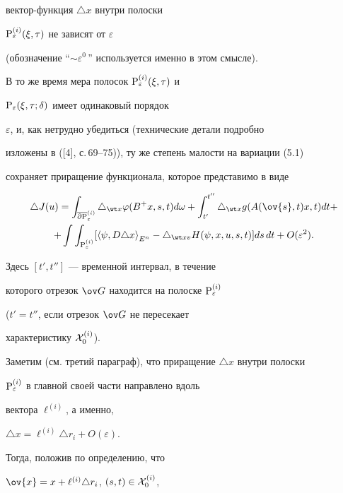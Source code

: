 вектор-функция $\triangle x$ внутри полоски


${\P}_{\varepsilon}^{(i)} (\xi,\tau)$ не зависят от $\varepsilon$


(обозначение ``$\sim \varepsilon^{0}$\,'' используется именно в этом смысле).


В то же время мера полосок ${\P}_{\varepsilon}^{(i)} (\xi,\tau)$ и


${\P}_{\varepsilon}(\xi,\tau; \delta)$ имеет одинаковый порядок


$\varepsilon$, и, как нетрудно убедиться (технические детали подробно


изложены в ([4], с.\,69--75)), ту же степень малости на вариации (5.1)


сохраняет приращение функционала, которое представимо в виде


\begin{multline}


\triangle J(u) = \int_{\overline{\partial{\P}}_{\varepsilon}^{(i)}}


\triangle_{\wt x} \varphi (B^{+}x,s,t) d\omega +


\int_{t'}^{t''}


\triangle_{\wt x} g(A(\ov{s},t)x,t)dt +  \\


+ \int \int_{{\P}_{\varepsilon}^{(i)}} 


[{\la \psi, D \triangle x\ra}_{E^n} - \triangle_{\wt x v}


H(\psi, x,u,s,t)] ds\,dt + O(\varepsilon^2).


\end{multline}


Здесь $[t',t'']$ --- временной интервал, в течение


которого отрезок $\ov G$ находится на полоске ${\P}_{\varepsilon}^{(i)}$


($t' = t''$, если отрезок $\ov G$ не пересекает


характеристику ${\cal X}_{0}^{(i)}$).


Заметим (см. третий параграф), что приращение $\triangle x$ внутри полоски


${\P}_{\varepsilon}^{(i)}$ в главной своей части направлено вдоль


вектора $\ell^{(i)}$, а именно,


$\triangle x = \ell^{(i)} \triangle r_i + O(\varepsilon)$.


Тогда, положив по определению, что


$\ov {x} = x + \ell^{(i)}\triangle r_i$, $(s,t) \in {\cal X}_{0}^{(i)}$,


